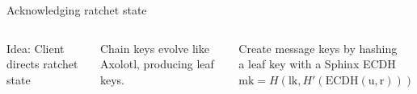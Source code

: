 \documentclass[fleqn,xcolor={usenames,dvipsnames}]{beamer}
\begin{document}
\begin{frame}[t]{Acknowledging ratchet state }
\begin{columns}[T]
Idea: Client directs ratchet state

\bigskip
Chain keys evolve like Axolotl, 
 \hspace*{2pt} producing leaf keys. %

\smallskip
Create message keys by hashing \\
 \hspace*{2pt} a leaf key with a Sphinx ECDH \\ %

\smallskip
 \hspace*{10pt} $\textrm{mk} = H(\textrm{lk},H'(\textrm{ECDH}(\textrm{u},\textrm{r})))$

\medskip
{}


\end{columns}
\end{frame}
\end{document}
